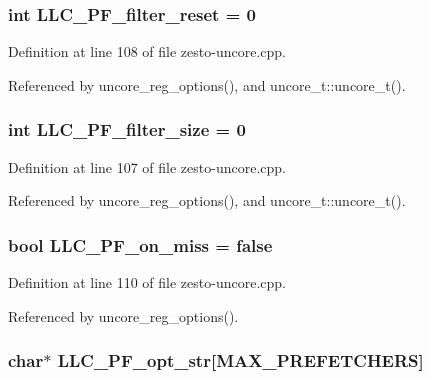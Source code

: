 \subsubsection[{LLC\_\-PF\_\-filter\_\-reset}]{\setlength{\rightskip}{0pt plus 5cm}int {\bf LLC\_\-PF\_\-filter\_\-reset} = 0\hspace{0.3cm}{\tt  [static]}}\label{zesto-uncore_8cpp_900853094dc4770f852e12b10f3a2c09}




Definition at line 108 of file zesto-uncore.cpp.

Referenced by uncore\_\-reg\_\-options(), and uncore\_\-t::uncore\_\-t().
\subsubsection[{LLC\_\-PF\_\-filter\_\-size}]{\setlength{\rightskip}{0pt plus 5cm}int {\bf LLC\_\-PF\_\-filter\_\-size} = 0\hspace{0.3cm}{\tt  [static]}}\label{zesto-uncore_8cpp_23fbb17815b47d0a6c20eb7674447294}




Definition at line 107 of file zesto-uncore.cpp.

Referenced by uncore\_\-reg\_\-options(), and uncore\_\-t::uncore\_\-t().
\subsubsection[{LLC\_\-PF\_\-on\_\-miss}]{\setlength{\rightskip}{0pt plus 5cm}bool {\bf LLC\_\-PF\_\-on\_\-miss} = false\hspace{0.3cm}{\tt  [static]}}\label{zesto-uncore_8cpp_c38dcc4648bb23ccb79b22d025d911c1}




Definition at line 110 of file zesto-uncore.cpp.

Referenced by uncore\_\-reg\_\-options().
\subsubsection[{LLC\_\-PF\_\-opt\_\-str}]{\setlength{\rightskip}{0pt plus 5cm}char$\ast$ {\bf LLC\_\-PF\_\-opt\_\-str}[MAX\_\-PREFETCHERS]\hspace{0.3cm}{\tt  [static]}}\label{zesto-uncore_8cpp_4ec8f11182f269716d68587feef47bcf}




